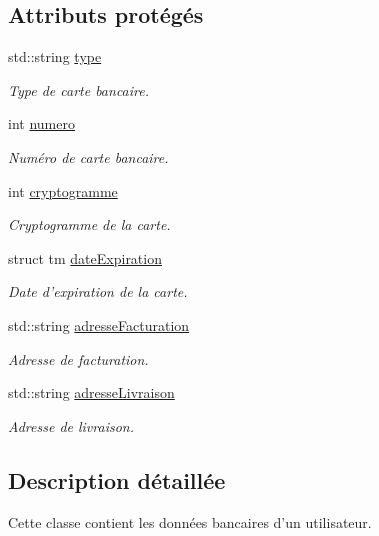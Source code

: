 \subsection*{Attributs protégés}
\begin{DoxyCompactItemize}
\item 
std\-::string \hyperlink{class_coords_bancaires_ad34142224a2753ad54dddf8d537564b1}{type}
\begin{DoxyCompactList}\small\item\em Type de carte bancaire. \end{DoxyCompactList}\item 
int \hyperlink{class_coords_bancaires_adabcd6ad108ed1345bebb08deb22ae17}{numero}
\begin{DoxyCompactList}\small\item\em Numéro de carte bancaire. \end{DoxyCompactList}\item 
int \hyperlink{class_coords_bancaires_af63951d077f5682efa2b3f3d469b8c95}{cryptogramme}
\begin{DoxyCompactList}\small\item\em Cryptogramme de la carte. \end{DoxyCompactList}\item 
struct tm \hyperlink{class_coords_bancaires_a51c54e20f3144261fdf534ec0bdac876}{date\-Expiration}
\begin{DoxyCompactList}\small\item\em Date d'expiration de la carte. \end{DoxyCompactList}\item 
std\-::string \hyperlink{class_coords_bancaires_aa03534839e8b86b99924494f1d19e92a}{adresse\-Facturation}
\begin{DoxyCompactList}\small\item\em Adresse de facturation. \end{DoxyCompactList}\item 
std\-::string \hyperlink{class_coords_bancaires_ad5a8cb68047dcd80d5a51b28465197df}{adresse\-Livraison}
\begin{DoxyCompactList}\small\item\em Adresse de livraison. \end{DoxyCompactList}\end{DoxyCompactItemize}


\subsection{Description détaillée}
Cette classe contient les données bancaires d'un utilisateur. 

